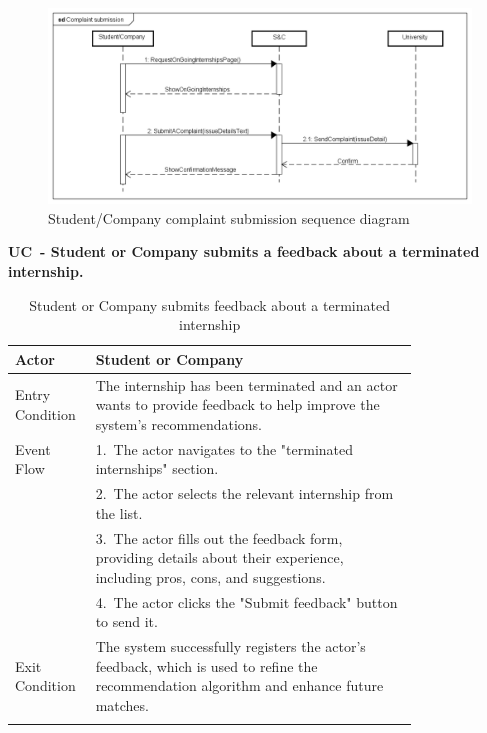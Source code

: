 \begin{figure}[H]
    \centering
    \includegraphics[width=1\linewidth]{Images/Sequence diagrams/Complaint submission.png}
    \caption{Student/Company complaint submission sequence diagram}
    \label{fig:enter-label}
\end{figure}

\textbf{UC\cuc\  - Student or Company submits a feedback about a terminated internship.}

\begin{center} 
    \renewcommand{\arraystretch}{1.2} 
    \begin{longtable}{ l p{0.8\linewidth} } 
        \hline 
        Actor & Student or Company \\ \hline 
        Entry Condition & The internship has been terminated and an actor wants to provide feedback to help improve the system's recommendations. \\ \hline 
        Event Flow & 1.\ The actor navigates to the "terminated internships" section. \\
        & 2.\ The actor selects the relevant internship from the list. \\
        & 3.\ The actor fills out the feedback form, providing details about their experience, including pros, cons, and suggestions. \\
        & 4.\ The actor clicks the "Submit feedback" button to send it. \\ \hline 
        Exit Condition & The system successfully registers the actor's feedback, which is used to refine the recommendation algorithm and enhance future matches. \\ \hline  
        \caption{Student or Company submits feedback about a terminated internship} 
        \label{tab:student_feedback_uc} 
    \end{longtable} 
\end{center}

